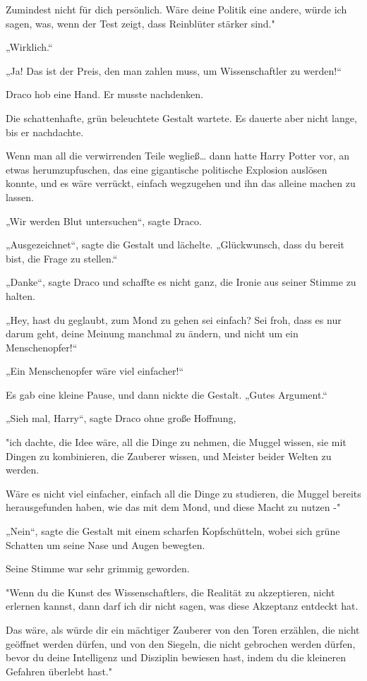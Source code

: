 {Zumindest nicht für dich persönlich. Wäre deine Politik eine andere, würde ich sagen, was, wenn der Test zeigt, dass Reinblüter stärker sind."

„Wirklich.“

„Ja! Das ist der Preis, den man zahlen muss, um Wissenschaftler zu werden!“

Draco hob eine Hand. Er musste nachdenken.

Die schattenhafte, grün beleuchtete Gestalt wartete. Es dauerte aber nicht lange, bis er nachdachte.

Wenn man all die verwirrenden Teile wegließ… dann hatte Harry Potter vor, an etwas herumzupfuschen, das eine gigantische politische Explosion auslösen konnte, und es wäre verrückt, einfach wegzugehen und ihn das alleine machen zu lassen.

„Wir werden Blut untersuchen“, sagte Draco.

„Ausgezeichnet“, sagte die Gestalt und lächelte. „Glückwunsch, dass du bereit bist, die Frage zu stellen.“

„Danke“, sagte Draco und schaffte es nicht ganz, die Ironie aus seiner Stimme zu halten.

„Hey, hast du geglaubt, zum Mond zu gehen sei einfach? Sei froh, dass es nur darum geht, deine Meinung manchmal zu ändern, und nicht um ein Menschenopfer!“

„Ein Menschenopfer wäre viel einfacher!“

Es gab eine kleine Pause, und dann nickte die Gestalt. „Gutes Argument.“

„Sieh mal, Harry“, sagte Draco ohne große Hoffnung,

"ich dachte, die Idee wäre, all die Dinge zu nehmen, die Muggel wissen, sie mit Dingen zu kombinieren, die Zauberer wissen, und Meister beider Welten zu werden.

Wäre es nicht viel einfacher, einfach all die Dinge zu studieren, die Muggel bereits herausgefunden haben, wie das mit dem Mond, und diese Macht zu nutzen -"

„Nein“, sagte die Gestalt mit einem scharfen Kopfschütteln, wobei sich grüne Schatten um seine Nase und Augen bewegten.

Seine Stimme war sehr grimmig geworden.

"Wenn du die Kunst des Wissenschaftlers, die Realität zu akzeptieren, nicht erlernen kannst, dann darf ich dir nicht sagen, was diese Akzeptanz entdeckt hat.

Das wäre, als würde dir ein mächtiger Zauberer von den Toren erzählen, die nicht geöffnet werden dürfen, und von den Siegeln, die nicht gebrochen werden dürfen, bevor du deine Intelligenz und Disziplin bewiesen hast, indem du die kleineren Gefahren überlebt hast."

}

